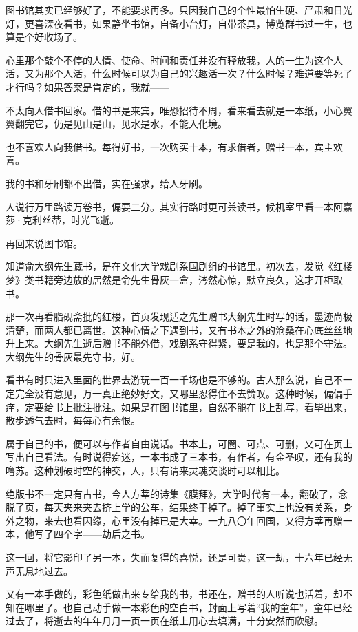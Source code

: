 \par 图书馆其实已经够好了，不能要求再多。只因我自己的个性最怕生硬、严肃和日光灯，更喜深夜看书，如果静坐书馆，自备小台灯，自带茶具，博览群书过一生，也算是个好收场了。
\par 心里那个敲个不停的人情、使命、时间和责任并没有释放我，人的一生为这个人活，又为那个人活，什么时候可以为自己的兴趣活一次？什么时候？难道要等死了才行吗？如果答案是肯定的，我就——
\par 不太向人借书回家。借的书是来宾，唯恐招待不周，看来看去就是一本纸，小心翼翼翻完它，仍是见山是山，见水是水，不能入化境。
\par 也不喜欢人向我借书。每得好书，一次购买十本，有求借者，赠书一本，宾主欢喜。
\par 我的书和牙刷都不出借，实在强求，给人牙刷。
\par 人说行万里路读万卷书，偏要二分。其实行路时更可兼读书，候机室里看一本阿嘉莎·克利丝蒂，时光飞逝。
\par 再回来说图书馆。
\par 知道俞大纲先生藏书，是在文化大学戏剧系国剧组的书馆里。初次去，发觉《红楼梦》类书籍旁边放的居然是俞先生骨灰一盒，涔然心惊，默立良久，这才开柜取书。
\par 那一次再看脂砚斋批的红楼，首页发现适之先生赠书大纲先生时写的话，墨迹尚极清楚，而两人都已离世。这种心情之下遇到书，又有书本之外的沧桑在心底丝丝地升上来。大纲先生逝后赠书不能外借，戏剧系守得紧，要是我的，也是那个守法。大纲先生的骨灰最先守书，好。
\par 看书有时只进入里面的世界去游玩一百一千场也是不够的。古人那么说，自己不一定完全没有意见，万一真正绝妙好文，又哪里忍得住不去赞叹。这种时候，偏偏手痒，定要给书上批注批注。如果是在图书馆里，自然不能在书上乱写，看毕出来，散步透气去时，每每心有余恨。
\par 属于自己的书，便可以与作者自由说话。书本上，可圈、可点、可删，又可在页上写出自己看法。有时说得痴迷，一本书成了三本书，有作者，有金圣叹，还有我的噜苏。这种划破时空的神交，人，只有请来灵魂交谈时可以相比。
\par 绝版书不一定只有古书，今人方莘的诗集《膜拜》，大学时代有一本，翻破了，念脱了页，每天夹来夹去挤上学的公车，结果终于掉了。掉了事实上也没有关系，身外之物，来去也看因缘，心里没有掉已是大幸。一九八〇年回国，又得方莘再赠一本，他写了四个字——劫后之书。
\par 这一回，将它影印了另一本，失而复得的喜悦，还是可贵，这一劫，十六年已经无声无息地过去。
\par 又有一本手做的，彩色纸做出来专给我的书，书还在，赠书的人听说也活着，却不知在哪里了。也自己动手做一本彩色的空白书，封面上写着“我的童年”，童年已经过去了，将逝去的年年月月一页一页在纸上用心去填满，十分安然而欣慰。
